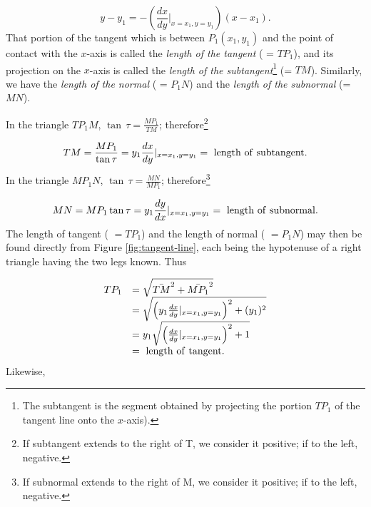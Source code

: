 \begin{equation}
y - y_1 = -(\frac{dx}{dy}|_{x=x_1,y=y_1})(x - x_1).
\label{eqn:65-2}
\end{equation}
That portion of the tangent which is %
between $P_1(x_1,y_1)$ and the point of contact with %
the $x$-axis %
is called the 
{\it length of the tangent} ( = $TP_1$), and its projection on the %
$x$-axis %
is called the {\it length of the subtangent}\footnote{The subtangent 
is the segment obtained by projecting the portion $TP_1$ of the tangent line
onto the $x$-axis).} %
(= $TM$). 
Similarly, we have the {\it length of the normal} ( = $P_1N$) 
and the {\it length of the subnormal} (= $MN$).

In the triangle $TP_1M$, $\tan\, \tau = \frac{MP_1}{TM}$; 
therefore\footnote{If subtangent extends to the right of T, 
we consider it positive; if to the left, negative.}

\begin{equation}
TM = \frac{MP_1}{\tan \tau} = y_1 \frac{dx}{dy}|_{x=x_1,y=y_1} =
\ {\rm length\ of\ subtangent}.
\label{eqn:3-65}
\end{equation}
In the triangle $MP_1N$, $\tan\, \tau = \frac{MN}{MP_1}$; 
therefore\footnote{ If subnormal extends to the right of M, 
we consider it positive; if to the left, negative.}

\begin{equation}
MN =MP_1 \tan \tau = y_1 \frac{dy}{dx}|_{x=x_1,y=y_1} 
= {\rm \ length\ of\ subnormal}.
\label{eqn:4-65}
\end{equation}
The length of tangent ( $= TP_1$) and the length of normal 
( $= P_1N$) may then be found directly from Figure \ref{fig:tangent-line}, 
each being the hypotenuse of a right triangle having the two 
legs known. Thus

\begin{equation}
\begin{array}{ll}
TP_1 
&= \sqrt{\bar{TM}^2 + \bar{MP_1}^2}\\
&= \sqrt{ \left ( y_1 \frac{dx}{dy}|_{x=x_1,y=y_1} \right)^2 + (y_1)^2}\\
&= y_1 \sqrt{ \left ( \frac{dx}{dy}|_{x=x_1,y=y_1} \right)^2 + 1}\\
 &=
\ {\rm length\ of\ tangent}.
\end{array}
\label{eqn:5-65}
\end{equation}
Likewise,

